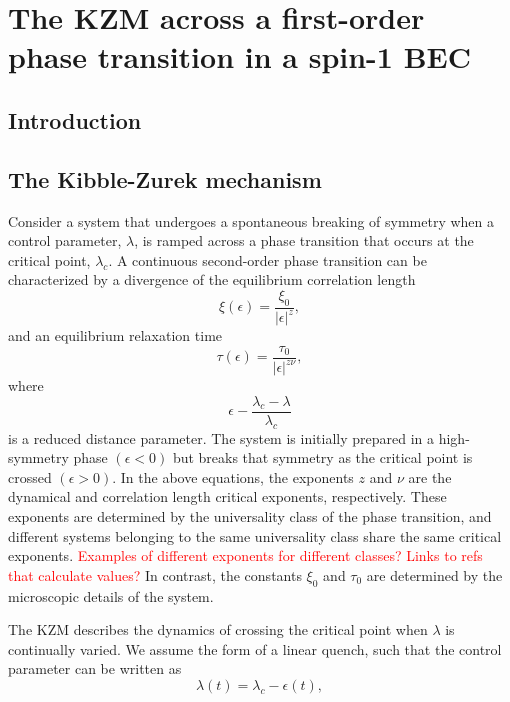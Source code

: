 \chapter{The KZM across a first-order phase transition in a spin-1 BEC}


\section{Introduction}

\section{The Kibble-Zurek mechanism}\label{sec:the-KZM}
Consider a system that undergoes a spontaneous breaking of symmetry when a
control parameter, $\lambda$, is ramped across a phase transition that occurs
at the critical point, $\lambda_c$.
A continuous second-order phase transition can be characterized by a divergence
of the equilibrium correlation length
\begin{equation}
    \xi(\epsilon) = \frac{\xi_0}{|\epsilon|^z},
\end{equation}
and an equilibrium relaxation time
\begin{equation}
    \tau(\epsilon) = \frac{\tau_0}{|\epsilon|^{z\nu}},
    \label{eq: equil-relax-time}
\end{equation}
where
\begin{equation}
    \epsilon - \frac{\lambda_c - \lambda}{\lambda_c}
\end{equation}
is a reduced distance parameter.
The system is initially prepared in a high-symmetry phase $(\epsilon < 0)$ but 
breaks that symmetry as the critical point is crossed $(\epsilon > 0)$.
In the above equations, the exponents $z$ and $\nu$ are the dynamical and
correlation length critical exponents, respectively.
These exponents are determined by the universality class of the phase
transition, and different systems belonging to the same universality class share
the same critical exponents.
\textcolor{red}{Examples of different exponents for different classes? Links
to refs that calculate values?}
In contrast, the constants $\xi_0$ and $\tau_0$ are determined by the
microscopic details of the system. \par
The KZM describes the dynamics of crossing the critical point when $\lambda$ 
is continually varied.
We assume the form of a linear quench, such that the control parameter can be
written as
\begin{equation}
    \lambda(t) = \lambda_c - \epsilon(t),
\end{equation}
